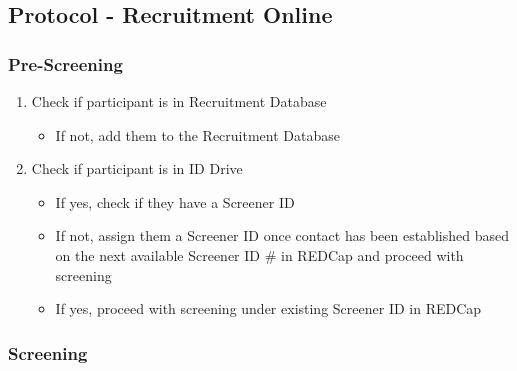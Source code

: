 \documentclass[]{book}
\providecommand{\tightlist}{%
  \setlength{\itemsep}{0pt}\setlength{\parskip}{0pt}}
\begin{document}
\hypertarget{protocol---recruitment-online}{%
\subsection{Protocol - Recruitment Online}\label{protocol---recruitment-online}}

\hypertarget{pre-screening}{%
\subsubsection{Pre-Screening}\label{pre-screening}}

\begin{enumerate}
\def\labelenumi{\arabic{enumi}.}
\tightlist
\item
  Check if participant is in Recruitment Database

  \begin{itemize}
  \tightlist
  \item
    If not, add them to the Recruitment Database
  \end{itemize}
\item
  Check if participant is in ID Drive

  \begin{itemize}
  \tightlist
  \item
    If yes, check if they have a Screener ID
  \item
    If not, assign them a Screener ID once contact has been established based on the next available Screener ID \# in REDCap and proceed with screening
  \item
    If yes, proceed with screening under existing Screener ID in REDCap
  \end{itemize}
\end{enumerate}

\hypertarget{screening}{%
\subsubsection{Screening}\label{screening}}
\end{document}
